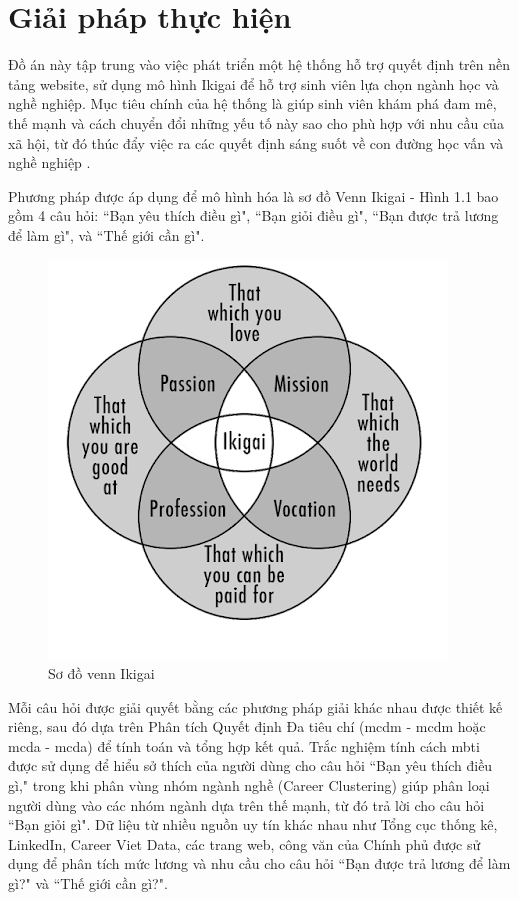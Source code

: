 \section{Giải pháp thực hiện}    
    Đồ án này tập trung vào việc phát triển một hệ thống hỗ trợ quyết định trên nền tảng website, sử dụng mô hình Ikigai để hỗ trợ sinh viên lựa chọn ngành học và nghề nghiệp. Mục tiêu chính của hệ thống là giúp sinh viên khám phá đam mê, thế mạnh và cách chuyển đổi những yếu tố này sao cho phù hợp với nhu cầu của xã hội, từ đó thúc đẩy việc ra các quyết định sáng suốt về con đường học vấn và nghề nghiệp .

    Phương pháp được áp dụng để mô hình hóa là sơ đồ Venn Ikigai - Hình 1.1 bao gồm 4 câu hỏi: ``Bạn yêu thích điều gì", ``Bạn giỏi điều gì", ``Bạn được trả lương để làm gì", và ``Thế giới cần gì". 
    \begin{figure}[H]
        \centering
        \includegraphics[width=0.5\linewidth]{images/chap1/ikigai.png}
        \vspace{0.6cm}
        \caption{Sơ đồ venn Ikigai}
    \end{figure}

    Mỗi câu hỏi được giải quyết bằng các phương pháp giải khác nhau được thiết kế riêng, sau đó dựa trên Phân tích Quyết định Đa tiêu chí (\acrlong{mcdm} - \acrshort{mcdm} hoặc \acrlong{mcda} - \acrshort{mcda}) để tính toán và tổng hợp kết quả. Trắc nghiệm tính cách \acrfull{mbti} được sử dụng để hiểu sở thích của người dùng cho câu hỏi ``Bạn yêu thích điều gì," trong khi phân vùng nhóm ngành nghề (Career Clustering) giúp phân loại người dùng vào các nhóm ngành dựa trên thế mạnh, từ đó trả lời cho câu hỏi ``Bạn giỏi gì". Dữ liệu từ nhiều nguồn uy tín khác nhau như Tổng cục thống kê, LinkedIn, Career Viet Data, các trang web, công văn của Chính phủ được sử dụng để phân tích mức lương và nhu cầu cho câu hỏi ``Bạn được trả lương để làm gì?" và ``Thế giới cần gì?".
    
